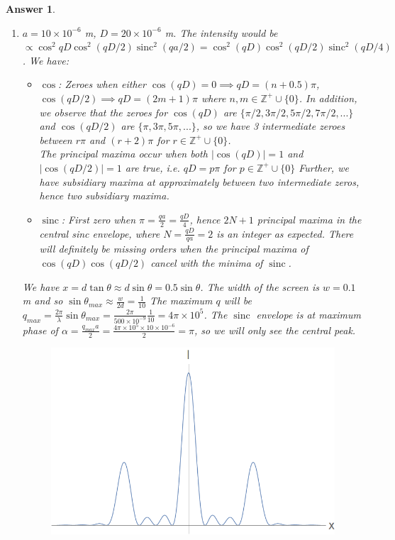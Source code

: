 \documentclass[a4paper]{article}
\DeclareMathOperator{\sinc}{sinc}
\newtheorem{ans}{Answer}[subsection]
\theoremstyle{new}
\begin{document}
\begin{ans}
\begin{enumerate}[label=(\alph*)]
\item $a=10\times10^{-6}$ m, $D=20\times10^{-6}$ m. The intensity would be $\propto\cos^2qD\cos^2(qD/2)\sinc^2(qa/2)=\cos^2(qD)\cos^2(qD/2)\sinc^2(qD/4)$. We have:
\begin{itemize}
    \item $\cos$: Zeroes when either $\cos(qD)=0\implies qD=(n+0.5)\pi$, $\cos(qD/2)\implies qD=(2m+1)\pi$ where $n,m\in\mathbb{Z}^+\cup\{0\}$. In addition, we observe that the zeroes for $\cos(qD)$ are $\{\pi/2,3\pi/2,5\pi/2,7\pi/2,...\}$ and $\cos(qD/2)$ are $\{\pi,3\pi,5\pi,...\}$, so we have 3 intermediate zeroes between $r\pi$ and $(r+2)\pi$ for $r\in\mathbb{Z}^+\cup\{0\}$.\\[5pt]
    The principal maxima occur when both $|\cos(qD)|=1$ and $|\cos(qD/2)|=1$ are true, i.e. $qD=p\pi$ for $p\in\mathbb{Z}^+\cup\{0\}$ Further, we have subsidiary maxima at approximately between two intermediate zeros, hence two subsidiary maxima.
    \item $\sinc$: First zero when $\pi=\frac{qa}{2}=\frac{qD}{4}$, hence $2N+1$ principal maxima in the central sinc envelope, where $N=\frac{qD}{qa}=2$ is an integer as expected. There will definitely be missing orders when the principal maxima of $\cos(qD)\cos(qD/2)$ cancel with the minima of $\sinc$.
\end{itemize}
We have $x=d\tan\theta\approx d\sin\theta=0.5\sin\theta$. The width of the screen is $w=0.1$ m and so $\sin\theta_{max}\approx\frac{w}{2d}=\frac{1}{10}$ The maximum $q$ will be $q_{max}=\frac{2\pi}{\lambda}\sin\theta_{max}=\frac{2\pi}{500\times10^{-9}}\frac{1}{10}=4\pi\times10^5$. The $\sinc$ envelope is at maximum phase of $\alpha=\frac{q_{max}a}{2}=\frac{4\pi\times10^5\times10\times10^{-6}}{2}=\pi$, so we will only see the central peak.
\begin{figure}[H]
    \centering
    \includegraphics[scale=0.25]{2019P2B8.png}

\end{figure}
\end{enumerate}
\end{ans}
\end{document}
